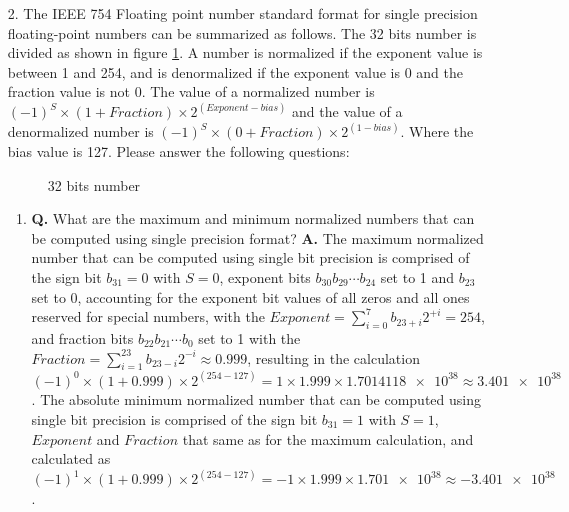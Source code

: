 \documentclass[main.tex]{subfiles}
\begin{document}
\begin{enumerate}
\item [2.] The IEEE 754 Floating point number standard format for single precision floating-point numbers can be summarized as follows. The 32 bits number is divided as shown in figure \ref{fig:f1}. A number is normalized if the exponent value is between 1 and 254, and is denormalized if the exponent value is 0 and the fraction value is not 0. The value of a normalized number is $(-1)^S \times (1+Fraction) \times 2^{(Exponent-bias)}$ and the value of a denormalized number is $(-1)^S \times (0+Fraction) \times 2^{(1-bias)}$. Where the bias value is 127. Please answer the following questions:

\begin{figure}
\centering{}
\caption{32 bits number}
\label{fig:f1}
\end{figure}

\begin{enumerate}
    \item \textbf{Q.} What are the maximum and minimum normalized numbers that can be computed using single precision format? \textbf{A.} The maximum normalized number that can be computed using single bit precision is comprised of the sign bit $b_{31} = 0$ with $S=0$, exponent bits $b_{30} b_{29} \cdots b_{24}$ set to 1 and $b_{23}$ set to 0, accounting for the exponent bit values of all zeros and all ones reserved for special numbers, with the $Exponent = \sum_{i=0}^{7} b_{23+i} 2^{+i} = 254$, and fraction bits $b_{22} b_{21} \cdots b_{0}$ set to 1 with the $Fraction = \sum_{i=1}^{23} b_{23-i} 2^{-i} \approx 0.999$, resulting in the calculation $(-1)^0 \times (1+0.999) \times 2^{(254-127)} = 1 \times 1.999 \times \num{1.7014118e38} \approx \num{3.401e38}$. The absolute minimum normalized number that can be computed using single bit precision is comprised of the sign bit $b_{31} = 1$ with $S=1$, $Exponent$ and $Fraction$ that same as for the maximum calculation, and calculated as $(-1)^1 \times (1+0.999) \times 2^{(254-127)} = -1 \times 1.999 \times \num{1.701e38} \approx \num{-3.401e38}$.
    

\end{enumerate}
\end{enumerate}
\end{document}
